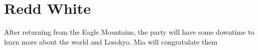 \section{Redd White}
After returning from the Eagle Mountains, the party will have some downtime to learn more about the world and Losokyo. Mia will congratulate them  
